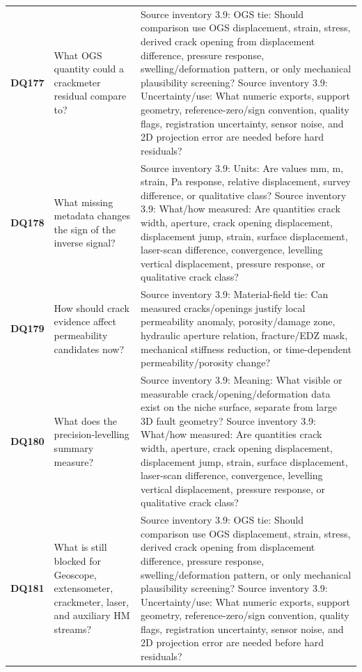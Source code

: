 \begin{longtable}{@{}L{0.09\textwidth} L{0.31\textwidth} L{0.52\textwidth}@{}}
\addlinespace[0.18em]
\textbf{DQ177} & What OGS quantity could a crackmeter residual compare to? & Source inventory 3.9: OGS tie: Should comparison use OGS displacement, strain, stress, derived crack opening from displacement difference, pressure response, swelling/deformation pattern, or only mechanical plausibility screening? Source inventory 3.9: Uncertainty/use: What numeric exports, support geometry, reference-zero/sign convention, quality flags, registration uncertainty, sensor noise, and 2D projection error are needed before hard residuals?\\
\addlinespace[0.18em]
\textbf{DQ178} & What missing metadata changes the sign of the inverse signal? & Source inventory 3.9: Units: Are values mm, m, strain, Pa response, relative displacement, survey difference, or qualitative class? Source inventory 3.9: What/how measured: Are quantities crack width, aperture, crack opening displacement, displacement jump, strain, surface displacement, laser-scan difference, convergence, levelling vertical displacement, pressure response, or qualitative crack class?\\
\addlinespace[0.18em]
\textbf{DQ179} & How should crack evidence affect permeability candidates now? & Source inventory 3.9: Material-field tie: Can measured cracks/openings justify local permeability anomaly, porosity/damage zone, hydraulic aperture relation, fracture/EDZ mask, mechanical stiffness reduction, or time-dependent permeability/porosity change?\\
\addlinespace[0.18em]
\textbf{DQ180} & What does the precision-levelling summary measure? & Source inventory 3.9: Meaning: What visible or measurable crack/opening/deformation data exist on the niche surface, separate from large 3D fault geometry? Source inventory 3.9: What/how measured: Are quantities crack width, aperture, crack opening displacement, displacement jump, strain, surface displacement, laser-scan difference, convergence, levelling vertical displacement, pressure response, or qualitative crack class?\\
\addlinespace[0.18em]
\textbf{DQ181} & What is still blocked for Geoscope, extensometer, crackmeter, laser, and auxiliary
HM streams? & Source inventory 3.9: OGS tie: Should comparison use OGS displacement, strain, stress, derived crack opening from displacement difference, pressure response, swelling/deformation pattern, or only mechanical plausibility screening? Source inventory 3.9: Uncertainty/use: What numeric exports, support geometry, reference-zero/sign convention, quality flags, registration uncertainty, sensor noise, and 2D projection error are needed before hard residuals?\\

\end{longtable}
